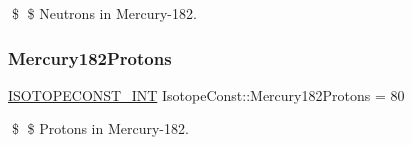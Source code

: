 \$ \$ Neutrons in Mercury-\/182. \mbox{\label{group___isotope_const-_mercury-_hg182_gad366a706d861b832f5364797f5ebd610}} 
\subsubsection{\texorpdfstring{Mercury182\+Protons}{Mercury182Protons}}
{\footnotesize\ttfamily \mbox{\hyperlink{group___isotope_const-_macros_ga5f18360b3e99483a35c32d789e62621c}{I\+S\+O\+T\+O\+P\+E\+C\+O\+N\+S\+T\+\_\+\+I\+NT}} Isotope\+Const\+::\+Mercury182\+Protons = 80}

\$ \$ Protons in Mercury-\/182. 